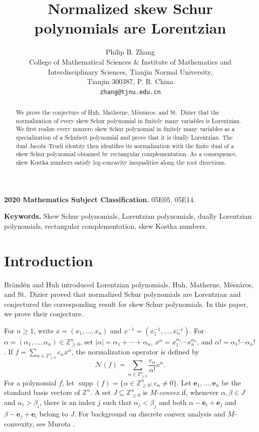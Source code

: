 \documentclass[11pt]{article}
\title{Normalized skew Schur polynomials are Lorentzian}
\author{Philip B. Zhang\\[2pt]
  \small College of Mathematical Sciences \& Institute of Mathematics and\\
  \small Interdisciplinary Sciences, Tianjin Normal University,\\
  \small Tianjin 300387, P. R. China\\[2pt]
  \small \texttt{zhang@tjnu.edu.cn}}
\date{}
\theoremstyle{definition}
\newcommand{\Nop}{\mathcal N}
\newcommand{\Znonneg}{\mathbb Z_{\ge0}}
\newcommand{\supp}{\operatorname{supp}}
\begin{document}
\maketitle

\begin{abstract}
We prove the conjecture of Huh, Matherne, M\'esz\'aros, and St.~Dizier that the normalization of every skew Schur polynomial in finitely many variables is Lorentzian.  We first realize every nonzero skew Schur polynomial in finitely many variables as a specialization of a Schubert polynomial and prove that it is dually Lorentzian.  The dual Jacobi--Trudi identity then identifies its normalization with the finite dual of a skew Schur polynomial obtained by rectangular complementation.  As a consequence, skew Kostka numbers satisfy log-concavity inequalities along the root directions.
\end{abstract}

\noindent\textbf{2020 Mathematics Subject Classification.}
05E05, 05E14.

\smallskip
\noindent\textbf{Keywords.}
Skew Schur polynomials, Lorentzian polynomials, dually Lorentzian polynomials,
rectangular complementation, skew Kostka numbers.

\section{Introduction}

Br\"and\'en and Huh \cite{BH} introduced Lorentzian polynomials.  Huh,
Matherne, M\'esz\'aros, and St.~Dizier
\cite[Theorem~3 and Conjecture~19]{HMMSD} proved that normalized Schur
polynomials are Lorentzian and conjectured the corresponding result for skew
Schur polynomials.  In this paper, we prove their conjecture.

For $n\ge1$, write $x=(x_1,\ldots,x_n)$ and
$x^{-1}=(x_1^{-1},\ldots,x_n^{-1})$.  For
$\alpha=(\alpha_1,\ldots,\alpha_n)\in\Znonneg^n$, set
$|\alpha|=\alpha_1+\cdots+\alpha_n$,
$x^\alpha=x_1^{\alpha_1}\cdots x_n^{\alpha_n}$, and
$\alpha!=\alpha_1!\cdots\alpha_n!$.  If
$f=\sum_{\alpha\in\Znonneg^n}c_\alpha x^\alpha$, the normalization operator
is defined by
\begin{equation}\label{eq:normalization}
  \Nop(f)
  =\sum_{\alpha\in\Znonneg^n}\frac{c_\alpha}{\alpha!}x^\alpha.
\end{equation}
For a polynomial $f$, let
$\supp(f)=\{\alpha\in\Znonneg^n:c_\alpha\ne0\}$.  Let
$\mathbf e_1,\ldots,\mathbf e_n$ be the standard basis vectors of
$\mathbb Z^n$.  A set $J\subseteq\Znonneg^n$ is \emph{$M$-convex} if, whenever
$\alpha,\beta\in J$ and $\alpha_i>\beta_i$, there is an index $j$ such that
$\alpha_j<\beta_j$ and both
$\alpha-\mathbf e_i+\mathbf e_j$ and
$\beta-\mathbf e_j+\mathbf e_i$ belong to $J$.
For background on discrete convex analysis and $M$-convexity, see Murota
\cite[Chapter~4]{Murota}.
\end{document}
